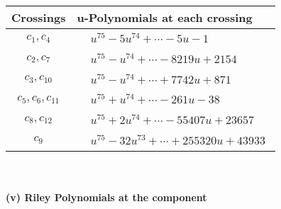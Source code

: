 \documentclass[1p]{elsarticle_modified}
\theoremstyle{definition}
\begin{document}
\begin{tabular}{m{50pt}|m{274pt}}
Crossings & \hspace{64pt}u-Polynomials at each crossing \\
\hline $$\begin{aligned}c_{1},c_{4}\end{aligned}$$&$\begin{aligned}
&u^{75}-5 u^{74}+\cdots-5 u-1
\end{aligned}$\\
\hline $$\begin{aligned}c_{2},c_{7}\end{aligned}$$&$\begin{aligned}
&u^{75}- u^{74}+\cdots-8219 u+2154
\end{aligned}$\\
\hline $$\begin{aligned}c_{3},c_{10}\end{aligned}$$&$\begin{aligned}
&u^{75}- u^{74}+\cdots+7742 u+871
\end{aligned}$\\
\hline $$\begin{aligned}c_{5},c_{6},c_{11}\end{aligned}$$&$\begin{aligned}
&u^{75}+u^{74}+\cdots-261 u-38
\end{aligned}$\\
\hline $$\begin{aligned}c_{8},c_{12}\end{aligned}$$&$\begin{aligned}
&u^{75}+2 u^{74}+\cdots-55407 u+23657
\end{aligned}$\\
\hline $$\begin{aligned}c_{9}\end{aligned}$$&$\begin{aligned}
&u^{75}-32 u^{73}+\cdots+255320 u+43933
\end{aligned}$\\
\hline
\end{tabular}\\~\\
\newpage\renewcommand{\arraystretch}{1}
\flushleft \textbf{(v) Riley Polynomials at the component}\newline \\
\end{document}
